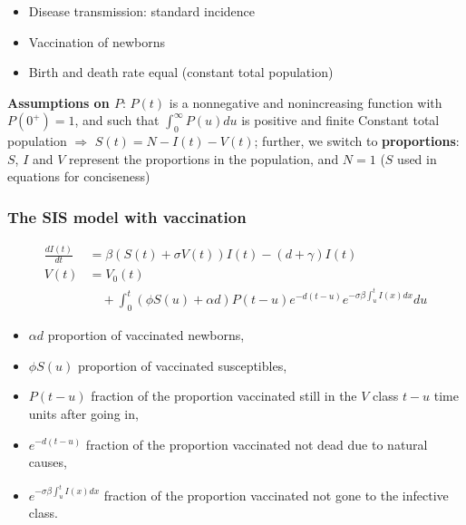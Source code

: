 \documentclass[aspectratio=169]{beamer}\usepackage[]{graphicx}\usepackage[]{xcolor}
\begin{document}
\begin{frame}\frametitle{}
\begin{itemize}
\item Disease transmission: standard incidence
\vfill
\item Vaccination of newborns
\vfill
\item Birth and death rate equal (\imply constant total population)
\end{itemize}

\textbf{Assumptions on $P$}: $P(t)$ is a nonnegative and nonincreasing
function with $P(0^+)=1$, and such that $\int_0^\infty P(u)du$ is
positive and finite
\vfill
Constant total population $\Rightarrow$ $S(t)=N-I(t)-V(t)$; further, we
switch to \textbf{proportions}: $S$, $I$ and $V$ represent the
proportions in the population, and $N=1$ ($S$ used in equations for
conciseness)
\end{frame}

\begin{frame}\frametitle{The SIS model with vaccination} 
\begin{subequations}\label{sys:SIVS_general}
\begin{align}
  \frac{dI(t)}{dt}&= \beta(S(t)+\sigma V(t))I(t)-(d+\gamma)I(t)
  \label{sys:SIVS_general_I}\\ 
  V(t)&= V_0(t) \label{sys:SIVS_general_V} \\
  &\quad +\int_0^t(\phi S(u)+\alpha d)P(t-u)e^{-d(t-u)}
  e^{-\sigma\beta\int_u^tI(x)dx}du \nonumber
\end{align}
\end{subequations}
\vfill
\begin{itemize}
\item $\alpha d$ proportion of vaccinated newborns,
\item $\phi S(u)$ proportion of vaccinated susceptibles, 
\item $P(t-u)$ fraction of the proportion vaccinated still in the $V$
  class $t-u$ time units after going in,
\item $e^{-d(t-u)}$ fraction of the proportion vaccinated
not dead due to natural causes,
\item $e^{-\sigma\beta\int_u^t I(x)dx}$ fraction of the proportion
  vaccinated not gone to the infective class.
\end{itemize} 
\end{frame}
\end{document}
